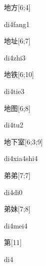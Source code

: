 \begin{verbete}[di4fang1]{地方}[6;4]
\begin{pronuncia}{di4fang1}
\end{pronuncia}
\end{verbete}

\begin{verbete}[di4zhi3]{地址}[6;7]
\begin{pronuncia}{di4zhi3}
\end{pronuncia}
\end{verbete}

\begin{verbete}[di4tie3]{地铁}[6;10]
\begin{pronuncia}{di4tie3}
\end{pronuncia}
\end{verbete}

\begin{verbete}[di4tu2]{地图}[6;8]
\begin{pronuncia}{di4tu2}
\end{pronuncia}
\end{verbete}

\begin{verbete}{地下室}[6;3;9]
\begin{pronuncia}{di4xia4shi4}
\end{pronuncia}
\end{verbete}

\begin{verbete}[di4di0]{弟弟}[7;7]
\begin{pronuncia}{di4di0}
\end{pronuncia}
\end{verbete}

\begin{verbete}[di4mei4]{弟妹}[7;8]
\begin{pronuncia}{di4mei4}
\end{pronuncia}
\end{verbete}

\begin{verbete}[di4]{第}[11]
\begin{pronuncia}{di4}
\end{pronuncia}
\end{verbete}

